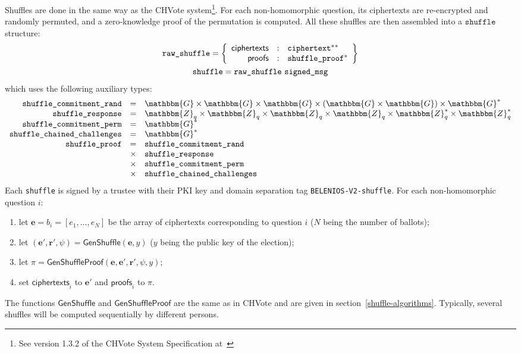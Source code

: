 \documentclass[a4paper]{article}
\newcommand{\dstprefix}{BELENIOS-V2}
\newcommand{\G}{\mathbbm{G}}
\newcommand{\Z}{\mathbbm{Z}}
\begin{document}
Shuffles are done in the same way as the CHVote system\footnote{See
  version 1.3.2 of the CHVote System Specification at~\cite{CHVote}}.
For each non-homomorphic
question, its ciphertexts are re-encrypted and randomly
permuted, and a zero-knowledge proof of the permutation is
computed. All these shuffles are then assembled into a
$\texttt{shuffle}$ structure:
\begin{gather*}
  \texttt{raw\_shuffle}=\left\{
    \begin{array}{rcl}
      \textsf{ciphertexts}&:&\texttt{ciphertext}^\ast{}^\ast\\
      \textsf{proofs}&:&\texttt{shuffle\_proof}^\ast
    \end{array}
  \right\}\\
  \texttt{shuffle}=\texttt{raw\_shuffle}\ \texttt{signed\_msg}
\end{gather*}
which uses the following auxiliary types:
\begin{gather*}
  \begin{array}{rcl}
    \texttt{shuffle\_commitment\_rand}&=&\G\times\G\times\G\times(\G\times\G)\times\G^\ast\\
    \texttt{shuffle\_response}&=&\Z_q\times\Z_q\times\Z_q\times\Z_q\times\Z_q^\ast\times\Z_q^\ast\\
    \texttt{shuffle\_commitment\_perm}&=&\G^\ast\\
    \texttt{shuffle\_chained\_challenges}&=&\G^\ast\\
    \texttt{shuffle\_proof}&=&\texttt{shuffle\_commitment\_rand}\\
                                      &\times&\texttt{shuffle\_response}\\
                                      &\times&\texttt{shuffle\_commitment\_perm}\\
                                      &\times&\texttt{shuffle\_chained\_challenges}
  \end{array}
\end{gather*}
Each \texttt{shuffle} is signed by a trustee with their PKI key and
domain separation tag \texttt{\dstprefix-shuffle}.  For each
non-homomorphic question $i$:
\begin{enumerate}
\item let $\textbf{e}=b_i=[e_1,\dots,e_N]$ be the array of ciphertexts
  corresponding to question $i$ ($N$ being the number of ballots);
\item let
  $(\textbf{e}',\textbf{r}',\psi)=\textsf{GenShuffle}(\textbf{e},y)$
  ($y$ being the public key of the election);
\item let
  $\pi=\textsf{GenShuffleProof}(\textbf{e},\textbf{e}',\textbf{r}',\psi,y)$;
  \item set $\textsf{ciphertexts}_i$ to $\textbf{e}'$ and
    $\textsf{proofs}_i$ to $\pi$.
\end{enumerate}
The functions $\textsf{GenShuffle}$ and $\textsf{GenShuffleProof}$ are
the same as in CHVote and are given in
section~\ref{shuffle-algorithms}. Typically, several shuffles will be
computed sequentially by different persons.
\end{document}
